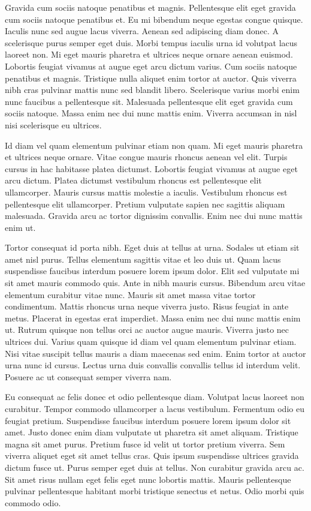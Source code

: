 \documentclass[11pt,a4paper]{article}
\begin{document}
Gravida cum sociis natoque penatibus et magnis. Pellentesque elit eget gravida cum sociis natoque penatibus et. Eu mi bibendum neque egestas congue quisque. Iaculis nunc sed augue lacus viverra. Aenean sed adipiscing diam donec. A scelerisque purus semper eget duis. Morbi tempus iaculis urna id volutpat lacus laoreet non. Mi eget mauris pharetra et ultrices neque ornare aenean euismod. Lobortis feugiat vivamus at augue eget arcu dictum varius. Cum sociis natoque penatibus et magnis. Tristique nulla aliquet enim tortor at auctor. Quis viverra nibh cras pulvinar mattis nunc sed blandit libero. Scelerisque varius morbi enim nunc faucibus a pellentesque sit. Malesuada pellentesque elit eget gravida cum sociis natoque. Massa enim nec dui nunc mattis enim. Viverra accumsan in nisl nisi scelerisque eu ultrices.

Id diam vel quam elementum pulvinar etiam non quam. Mi eget mauris pharetra et ultrices neque ornare. Vitae congue mauris rhoncus aenean vel elit. Turpis cursus in hac habitasse platea dictumst. Lobortis feugiat vivamus at augue eget arcu dictum. Platea dictumst vestibulum rhoncus est pellentesque elit ullamcorper. Mauris cursus mattis molestie a iaculis. Vestibulum rhoncus est pellentesque elit ullamcorper. Pretium vulputate sapien nec sagittis aliquam malesuada. Gravida arcu ac tortor dignissim convallis. Enim nec dui nunc mattis enim ut.

Tortor consequat id porta nibh. Eget duis at tellus at urna. Sodales ut etiam sit amet nisl purus. Tellus elementum sagittis vitae et leo duis ut. Quam lacus suspendisse faucibus interdum posuere lorem ipsum dolor. Elit sed vulputate mi sit amet mauris commodo quis. Ante in nibh mauris cursus. Bibendum arcu vitae elementum curabitur vitae nunc. Mauris sit amet massa vitae tortor condimentum. Mattis rhoncus urna neque viverra justo. Risus feugiat in ante metus. Placerat in egestas erat imperdiet. Massa enim nec dui nunc mattis enim ut. Rutrum quisque non tellus orci ac auctor augue mauris. Viverra justo nec ultrices dui. Varius quam quisque id diam vel quam elementum pulvinar etiam. Nisi vitae suscipit tellus mauris a diam maecenas sed enim. Enim tortor at auctor urna nunc id cursus. Lectus urna duis convallis convallis tellus id interdum velit. Posuere ac ut consequat semper viverra nam.

Eu consequat ac felis donec et odio pellentesque diam. Volutpat lacus laoreet non curabitur. Tempor commodo ullamcorper a lacus vestibulum. Fermentum odio eu feugiat pretium. Suspendisse faucibus interdum posuere lorem ipsum dolor sit amet. Justo donec enim diam vulputate ut pharetra sit amet aliquam. Tristique magna sit amet purus. Pretium fusce id velit ut tortor pretium viverra. Sem viverra aliquet eget sit amet tellus cras. Quis ipsum suspendisse ultrices gravida dictum fusce ut. Purus semper eget duis at tellus. Non curabitur gravida arcu ac. Sit amet risus nullam eget felis eget nunc lobortis mattis. Mauris pellentesque pulvinar pellentesque habitant morbi tristique senectus et netus. Odio morbi quis commodo odio.
\end{document}
